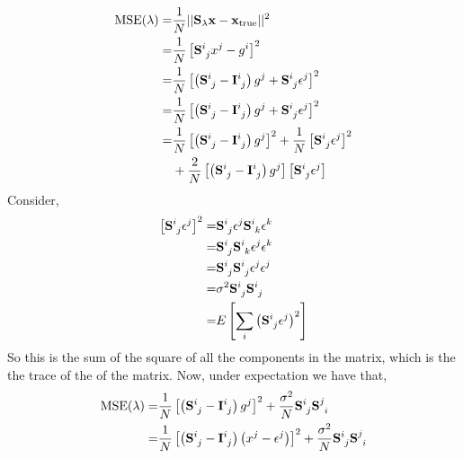 \documentclass[11pt]{article}
\begin{document}
\begin{align}
    \textrm{MSE}(\lambda) =& \frac{1}{N} || \mathbf{S_\lambda}\mathbf{x} - \mathbf{x}_{\textrm{true}} ||^2 \\
    =& \frac{1}{N} \left[ \mathbf{S}\indices{^i_j} x^j - g^i \right]^2 \\
    =& \frac{1}{N} \left[ \left(\mathbf{S}\indices{^i_j} -\mathbf{I}\indices{^i_j} \right) g^j + \mathbf{S}\indices{^i_j} \epsilon^j \right]^2 \\
    =& \frac{1}{N} \left[ \left(\mathbf{S}\indices{^i_j} -\mathbf{I}\indices{^i_j} \right) g^j + \mathbf{S}\indices{^i_j} \epsilon^j \right]^2 \\ \nonumber
    =& \frac{1}{N} \left[ \left(\mathbf{S}\indices{^i_j} -\mathbf{I}\indices{^i_j} \right) g^j  \right]^2  + \frac{1}{N} \left[ \mathbf{S}\indices{^i_j} \epsilon^j \right]^2\\
    & +\frac{2}{N} \left[ \left(\mathbf{S}\indices{^i_j} -\mathbf{I}\indices{^i_j} \right) g^j  \right] \left[ \mathbf{S}\indices{^i_j} \epsilon^j \right]
\end{align}
Consider,
\begin{align}
    \left[\mathbf{S}\indices{^i_j} \epsilon^j\right]^2 =& \mathbf{S}\indices{^i_j} \epsilon^j \mathbf{S}\indices{^i_k} \epsilon^k \\
    =& \mathbf{S}\indices{^i_j}\mathbf{S}\indices{^i_k} \epsilon^j \epsilon^k \\
    =& \mathbf{S}\indices{^i_j}\mathbf{S}\indices{^i_j} \epsilon^j \epsilon^j \\
    =& \sigma^2 \mathbf{S}\indices{^i_j}\mathbf{S}\indices{^i_j} \\
    =& E\left[\sum_i \left( \mathbf{S}\indices{^i_j} \epsilon^j \right)^2 \right]
\end{align}
So this is the sum of the square of all the components in the matrix, which is the the trace of the of the matrix.
Now, under expectation we have that,
\begin{align}
    \textrm{MSE}(\lambda) =& \frac{1}{N} \left[ \left(\mathbf{S}\indices{^i_j} -\mathbf{I}\indices{^i_j} \right) g^j  \right]^2  + \frac{\sigma^2}{N} \mathbf{S}\indices{^i_j} \mathbf{S}\indices{^j_i} \\
    =& \frac{1}{N} \left[ \left(\mathbf{S}\indices{^i_j} -\mathbf{I}\indices{^i_j} \right) \left(x^j-\epsilon^j\right)  \right]^2  + \frac{\sigma^2}{N} \mathbf{S}\indices{^i_j} \mathbf{S}\indices{^j_i}
\end{align}
\end{document}

